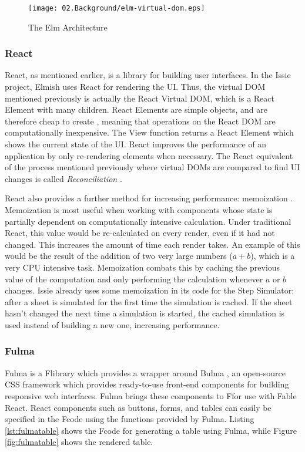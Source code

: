 \begin{figure} [h]
    \centering
    \texttt{[image: 02.Background/elm-virtual-dom.eps]}
    \caption{The Elm Architecture \cite{virtualdom}}
    \label{fig:virtualDOM}
\end{figure}

\subsubsection{React}
React, as mentioned earlier, is a library for building user interfaces. In the Issie project, Elmish uses React for rendering the UI. Thus, the virtual DOM mentioned previously is actually the React Virtual DOM, which is a React Element with many children. React Elements are simple objects, and are therefore cheap to create \cite{reactrender}, meaning that operations on the React DOM are computationally inexpensive. The View function returns a React Element which shows the current state of the UI. React improves the performance of an application by only re-rendering elements when necessary. The React equivalent of the process mentioned previously where virtual DOMs are compared to find UI changes is called \textit{Reconciliation} \cite{reactrender}.

React also provides a further method for increasing performance: memoization \cite{reactcache}. Memoization is most useful when working with components whose state is partially dependent on computationally intensive calculation. Under traditional React, this value would be re-calculated on every render, even if it had not changed. This increases the amount of time each render takes. An example of this would be the result of the addition of two very large numbers ($a + b$), which is a very CPU intensive task. Memoization combats this by caching the previous value of the computation and only performing the calculation whenever $a$ or $b$ changes. Issie already uses some memoization in its code for the Step Simulator: after a sheet is simulated for the first time the simulation is cached. If the sheet hasn't changed the next time a simulation is started, the cached simulation is used instead of building a new one, increasing performance. 
\subsubsection{Fulma}
Fulma \cite{fulmaio} is a F\fsharp library which provides a wrapper around Bulma \cite{bulmaio}, an open-source CSS framework which provides ready-to-use front-end components for building responsive web interfaces. Fulma brings these components to F\fsharp for use with Fable React. React components such as buttons, forms, and tables can easily be specified in the F\fsharp code using the functions provided by Fulma. Listing \ref{lst:fulmatable} shows the F\fsharp code for generating a table using Fulma, while Figure \ref{fig:fulmatable} shows the rendered table.

